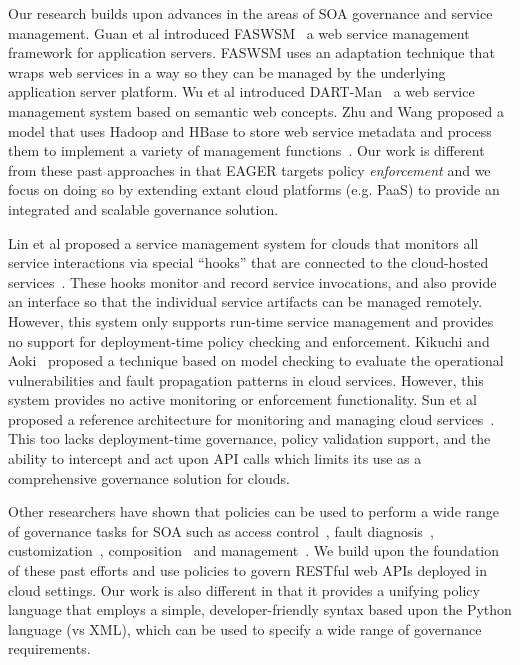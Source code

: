 Our research builds upon advances in the areas of SOA governance and
service management. 
Guan et al introduced FASWSM~\cite{1607141} a web service management
framework for application servers. FASWSM uses an adaptation technique that
wraps web services in a way so they can be managed by the underlying
application server platform. Wu et al introduced DART-Man~\cite{1504267} a web
service management system based on semantic web concepts.  Zhu and Wang
proposed a model that uses Hadoop and HBase to store web service metadata and
process them to implement a variety of management functions~\cite{5959326}.
Our work is different 
from these past approaches in that EAGER targets policy \textit{enforcement} 
and we focus on doing so by extending extant
cloud platforms (e.g. PaaS) to provide an integrated and scalable governance
solution.

Lin et al proposed a service management system for clouds that monitors all
service interactions via special ``hooks'' that are connected to the
cloud-hosted services~\cite{5616981}. These hooks monitor and record service
invocations, and also provide an interface so that the individual service
artifacts can be managed remotely. However, this system only supports run-time
service management and provides no support for deployment-time policy checking
and enforcement.  Kikuchi and Aoki~\cite{6525502} proposed a technique
based on model checking to evaluate the operational vulnerabilities and fault
propagation patterns in cloud services. However, this system provides no
active monitoring or enforcement functionality.
Sun et al proposed a reference architecture for monitoring and managing cloud
services~\cite{5579654}. This too lacks deployment-time governance, policy
validation support, and the ability to intercept and act upon API calls which
limits its use as a comprehensive governance solution for clouds.

Other researchers have shown that policies can be
used to perform a wide range of governance tasks for SOA such as access
control~\cite{4279630,5713420}, fault diagnosis~\cite{6154236},
customization~\cite{4027138},
composition~\cite{1592403,Erradi:2006:PMS:1515984.1515990} and
management~\cite{Suleiman:2009:IUM:1564601.1564730,6481237,4028029}. We build
upon the foundation of these past efforts and use policies to govern
RESTful web APIs deployed in cloud settings. 
Our work is also different in that it provides a 
unifying policy language that employs a simple, developer-friendly syntax
based upon the Python language (vs XML), which can be
used to specify a wide range of governance requirements.

